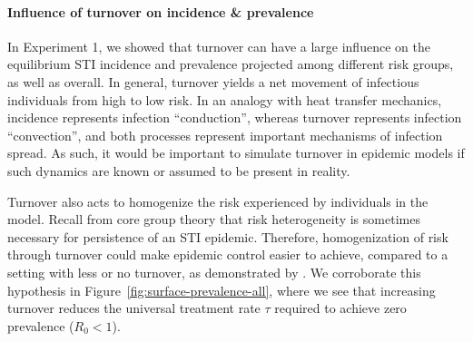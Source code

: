 \paragraph{Influence of turnover on incidence \& prevalence}
In Experiment 1, we showed that turnover can have a large influence on
the equilibrium STI incidence and prevalence
projected among different risk groups, as well as overall.
In general, turnover yields a net movement of infectious individuals
from high to low risk.
In an analogy with heat transfer mechanics,
incidence represents infection ``conduction'',
whereas turnover represents infection ``convection'',
and both processes represent important mechanisms of infection spread.
As such, it would be important to simulate turnover in epidemic models
if such dynamics are known or assumed to be present in reality.
\par
Turnover also acts to homogenize the risk experienced by individuals in the model.
Recall from core group theory that
risk heterogeneity is sometimes necessary for persistence of an STI epidemic.
Therefore, homogenization of risk through turnover
could make epidemic control easier to achieve,
compared to a setting with less or no turnover,
as demonstrated by \citet{Henry2015}.
We corroborate this hypothesis in Figure~\ref{fig:surface-prevalence-all},
where we see that increasing turnover reduces
the universal treatment rate $\tau$ required to achieve zero prevalence ($R_0 < 1$).
